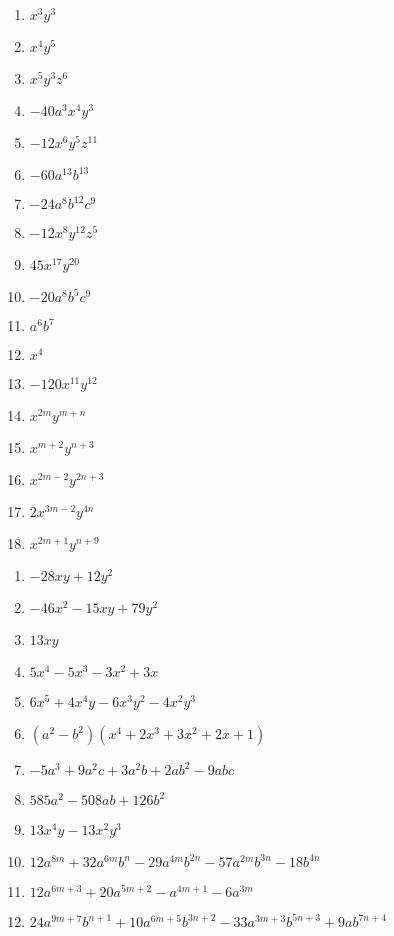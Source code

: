 \begin{solution} \hfill \vspace{-0.8cm}
\begin{multicols}{3}
\begin{enumerate}
\item ${{x}^{3}}{{y}^{3}}$	
\item ${{x}^{4}}y{}^{5}$	
\item ${{x}^{5}}{{y}^{3}}{{z}^{6}}$	
\item $-40{{a}^{3}}{{x}^{4}}{{y}^{3}}$	
\item $-12{{x}^{6}}{{y}^{5}}{{z}^{11}}$	
\item $-60{{a}^{13}}{{b}^{13}}$	
\item $-24{{a}^{8}}{{b}^{12}}{{c}^{9}}$	
\item $-12{{x}^{8}}{{y}^{12}}{{z}^{5}}$	
\item $45{{x}^{17}}{{y}^{20}}$	
\item $-20{{a}^{8}}{{b}^{5}}{{c}^{9}}$	
\item ${{a}^{6}}{{b}^{7}}$	
\item ${{x}^{4}}$	
\item $-120{{x}^{11}}{{y}^{12}}$
\item ${{x}^{2m}}{{y}^{m+n}}$
\item ${{x}^{m+2}}{{y}^{n+3}}$
\item ${{x}^{2m-2}}{{y}^{2n+3}}$ 
\item $2{{x}^{3m-2}}{{y}^{4n}}$
\item ${{x}^{2m+1}}{{y}^{n+9}}$
\end{enumerate}
\end{multicols}
\end{solution}

\begin{solution} \hfill \vspace{-0.8cm}
\begin{multicols}{2}
\begin{enumerate}
\item $-28xy+12{{y}^{2}}$	
\item $-46{{x}^{2}}-15xy+79{{y}^{2}}$	
\item $13xy$	
\item $5{{x}^{4}}-5{{x}^{3}}-3{{x}^{2}}+3x$	
\item $6{{x}^{5}}+4{{x}^{4}}y-6{{x}^{3}}{{y}^{2}}-4{{x}^{2}}{{y}^{3}}$	
\item $\left( {{a}^{2}}-{{b}^{2}} \right)\left( {{x}^{4}}+ 2 x^3 + 3 {{x}^{2}}+ 2 x + 1 \right)$	
\item $-5{{a}^{3}}+9{{a}^{2}}c+3{{a}^{2}}b+2a{{b}^{2}}-9abc$
\item $585{{a}^{2}}-508ab+126{{b}^{2}}$
\item $13{{x}^{4}}y-13{{x}^{2}}{{y}^{3}}$
\item $12{{a}^{8m}}+32{{a}^{6m}}{{b}^{n}}-29{{a}^{4m}}{{b}^{2n}}-57{{a}^{2m}}{{b}^{3n}}-18{{b}^{4n}}$
\item $12{{a}^{6m+3}}+20{{a}^{5m+2}}-{{a}^{4m+1}}-6{{a}^{3m}}$
\item $24{{a}^{9m+7}}{{b}^{n+1}}+10{{a}^{6m+5}}{{b}^{3n+2}}-33{{a}^{3m+3}}{{b}^{5n+3}}+9a{{b}^{7n+4}}$
\end{enumerate}
\end{multicols}
\end{solution}
 
